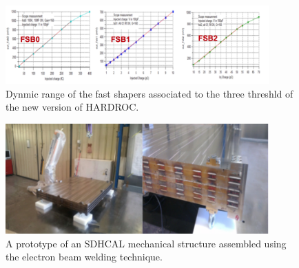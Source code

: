 \begin{figure}
\centering
\includegraphics[width=0.90\textwidth]{Calorimeter/SDHCAL_GRPC/figures/FSB.png}
\caption{Dynmic range of the fast shapers associated to the three threshld of the new version of HARDROC.}\label{fig:Calorimeter:SDHCAL_GRPC:FSB}
\end{figure}

\begin{figure}
\centering
\includegraphics[width=0.90\textwidth]{Calorimeter/SDHCAL_GRPC/figures/EBW.png}
\caption{A prototype of an SDHCAL mechanical structure assembled using the electron beam welding technique.}\label{fig:Calorimeter:SDHCAL_GRPC:EBW}
\end{figure}
